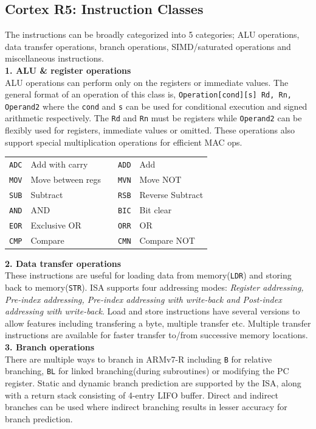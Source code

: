 \documentclass[a4paper,11pt]{article}
\begin{document}
\subsection{Cortex R5: Instruction Classes}
The instructions can be broadly categorized into 5 categories; ALU operations, data transfer operations, branch operations, SIMD/saturated operations and miscellaneous instructions.\cite{ARMpg}\\
\textbf{1. ALU \& register operations}\\
ALU operations can perform only on the registers or immediate values. The general format of an operation of this class is, {\tt Operation[cond][s] Rd, Rn, Operand2} where the {\tt cond} and {\tt s} can be used for conditional execution and signed arithmetic respectively. The {\tt Rd} and {\tt Rn} must be registers while {\tt Operand2} can be flexibly used for registers, immediate values or omitted. These operations also support special multiplication operations for efficient MAC ops.
\begin{tabular}{l l c l l}
{\tt ADC} & Add with carry & & {\tt ADD} & Add\\
{\tt MOV} & Move between regs & & {\tt MVN} & Move NOT\\
{\tt SUB} & Subtract & & {\tt RSB} & Reverse Subtract\\
{\tt AND} & AND & & {\tt BIC} & Bit clear\\
{\tt EOR} & Exclusive OR & & {\tt ORR} & OR\\
{\tt CMP} & Compare & & {\tt CMN} & Compare NOT\\
\end{tabular}
\textbf{2. Data transfer operations}\\
These instructions are useful for loading data from memory({\tt LDR}) and storing back to memory({\tt STR}). ISA supports four addressing modes: \textit{Register addressing, Pre-index addressing, Pre-index addressing with write-back and Post-index addressing with write-back}. Load and store instructions have several versions to allow features including transfering a byte, multiple transfer etc. Multiple transfer instructions are available for faster transfer to/from successive memory locations.\\
\textbf{3. Branch operations}\\
There are multiple ways to branch in ARMv7-R including {\tt B} for relative branching, {\tt BL} for linked branching(during subroutines) or modifying the PC register. Static and dynamic branch prediction are supported by the ISA, along with a return stack consisting of 4-entry LIFO buffer. Direct and indirect branches can be used where indirect branching results in lesser accuracy for branch prediction.\\
\end{document}
